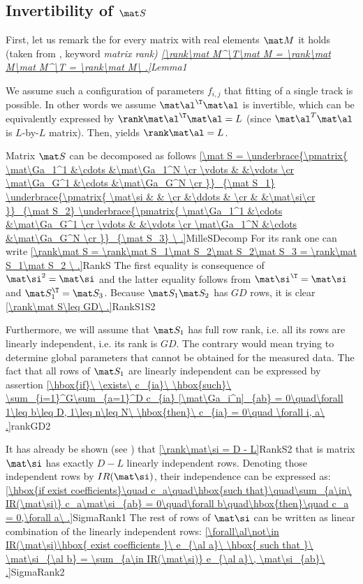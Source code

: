 \subsection{Invertibility of $\mat S$}

First, let us remark the for every matrix with real elements $\mat M$ it holds (taken from , keyword \em{matrix rank})
\eqref{\rank\mat M^\T\mat M = \rank\mat M\mat M^\T = \rank\mat M\ .}{Lemma1}

We assume such a configuration of parameters $f_{i,j}$ that fitting of a single track is possible. In other words we assume $\mat\al^\T\mat\al$ is invertible, which can be equivalently expressed by $\rank \mat\al^\T\mat\al = L$ (since $\mat\al^T\mat\al$ is $L$-by-$L$ matrix). Then,  yields $\rank\mat\al = L$.

Matrix $\mat S$ can be decomposed as follows
\eqref{\mat S = 
\underbrace{\pmatrix{
\mat\Ga_1^1	&\cdots	&\mat\Ga_1^N	\cr
\vdots		&		&\vdots			\cr
\mat\Ga_G^1	&\cdots	&\mat\Ga_G^N	\cr
}}_{\mat S_1}
\underbrace{\pmatrix{
\mat\si	&		&		\cr
		&\ddots	&		\cr
		&		&\mat\si\cr
}}_{\mat S_2}
\underbrace{\pmatrix{
\mat\Ga_1^1	&\cdots	&\mat\Ga_G^1	\cr
\vdots		&		&\vdots			\cr
\mat\Ga_1^N	&\cdots	&\mat\Ga_G^N	\cr
}}_{\mat S_3}
\ .}{MilleSDecomp}
For its rank one can write
\eqref{\rank\mat S = \rank\mat S_1\mat S_2\mat S_2\mat S_3 = \rank\mat S_1\mat S_2 \ .}{RankS}
The first equality is consequence of $\mat\si^2=\mat\si$ and the latter equality follows from $\mat\si^\T = \mat\si$ and $\mat S_1^\T = \mat S_3$. Because $\mat S_1\mat S_2$ has $GD$ rows, it is clear
\eqref{\rank\mat S\leq GD\ .}{RankS1S2}

Furthermore, we will assume that $\mat S_1$ has full row rank, i.e. all its rows are linearly independent, i.e. its rank is $GD$. The contrary would mean trying to determine global parameters that cannot be obtained for the measured data. The fact that all rows of $\mat S_1$ are linearly independent can be expressed by assertion
\eqref{\hbox{if}\ \exists\ c_{ia}\ \hbox{such}\ \sum_{i=1}^G\sum_{a=1}^D c_{ia} [\mat\Ga_i^n]_{ab} = 0\quad\forall 1\leq b\leq D, 1\leq n\leq N\ \hbox{then}\ c_{ia} = 0\quad \forall i, a\ .}{rankGD2}

It has already be shown (see ) that
\eqref{\rank\mat\si = D - L}{RankS2}
that is matrix $\mat\si$ has exactly $D-L$ linearly independent rows. Denoting those independent rows by $IR(\mat\si)$, their independence can be expressed as:
\eqref{\hbox{if exist coefficients}\quad c_a\quad\hbox{such that}\quad\sum_{a\in\ IR(\mat\si)} c_a\mat\si_{ab} = 0\quad\forall b\quad\hbox{then}\quad c_a = 0,\forall a\ .}{SigmaRank1}
The rest of rows of $\mat\si$ can be written as linear combination of the linearly independent rows:
\eqref{\forall\al\not\in IR(\mat\si)\hbox{ exist coefficients }\ e_{\al a}\ \hbox{ such that }\ \mat\si_{\al b} = \sum_{a\in IR(\mat\si)} e_{\al a}\, \mat\si_{ab}\ .}{SigmaRank2}

